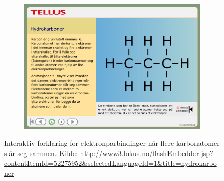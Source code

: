 \documentclass[main.tex]{subfiles}
\begin{document}
\begin{figure}[h!]
\begin{subfigure}{.5\textwidth}
\end{subfigure}%
\begin{subfigure}{.5\textwidth}
  \centering
  \includegraphics[scale = 0.199]{../figures/lokus4.png}
\end{subfigure}
\caption{Interaktiv forklaring for elektronparbindinger når flere karbonatomer slår seg sammen. Kilde: 
\protect\url{http://www3.lokus.no/flashEmbedder.jsp?contentItemId=52275952&selectedLanguageId=1&title=hydrokarboner}}
\label{fig:lokus}
\end{figure}
\end{document}
